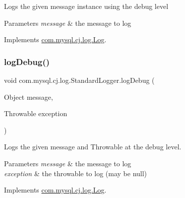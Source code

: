 Logs the given message instance using the \textquotesingle{}debug\textquotesingle{} level


\begin{DoxyParams}{Parameters}
{\em message} & the message to log \\
\hline
\end{DoxyParams}


Implements \mbox{\hyperlink{interfacecom_1_1mysql_1_1cj_1_1log_1_1_log_a6149f715730ea0615ef6e341dd3e8a39}{com.\+mysql.\+cj.\+log.\+Log}}.

\mbox{\label{classcom_1_1mysql_1_1cj_1_1log_1_1_standard_logger_a8f641c61351e0b4242bc14c49d72f603}} 
\subsubsection{\texorpdfstring{log\+Debug()}{logDebug()}\hspace{0.1cm}{\footnotesize\ttfamily [2/2]}}
{\footnotesize\ttfamily void com.\+mysql.\+cj.\+log.\+Standard\+Logger.\+log\+Debug (\begin{DoxyParamCaption}\item[{Object}]{message,  }\item[{Throwable}]{exception }\end{DoxyParamCaption})}

Logs the given message and Throwable at the \textquotesingle{}debug\textquotesingle{} level.


\begin{DoxyParams}{Parameters}
{\em message} & the message to log \\
\hline
{\em exception} & the throwable to log (may be null) \\
\hline
\end{DoxyParams}


Implements \mbox{\hyperlink{interfacecom_1_1mysql_1_1cj_1_1log_1_1_log_a42c9900bc643b771d7e337686ac4f799}{com.\+mysql.\+cj.\+log.\+Log}}.

\mbox{\label{classcom_1_1mysql_1_1cj_1_1log_1_1_standard_logger_a190ac11ebc3b482ff9016af3e9a14ca4}} 
